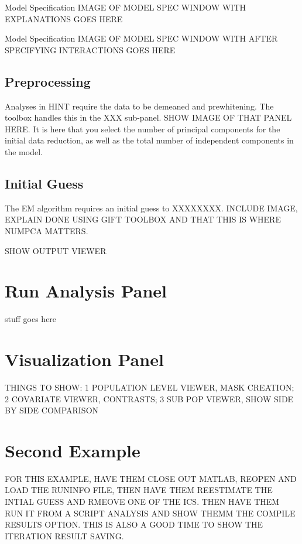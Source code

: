 \documentclass[11pt]{beamer}
\begin{document}
\begin{frame}{Model Specification}
IMAGE OF MODEL SPEC WINDOW WITH EXPLANATIONS GOES HERE
\end{frame}


\begin{frame}{Model Specification}
IMAGE OF MODEL SPEC WINDOW WITH AFTER SPECIFYING INTERACTIONS GOES HERE
\end{frame}

\subsection{Preprocessing}

\begin{frame}
Analyses in HINT require the data to be demeaned and prewhitening. The toolbox handles this in the XXX sub-panel. SHOW IMAGE OF THAT PANEL HERE. It is here that you select the number of principal components for the initial data reduction, as well as the total number of independent components in the model.
\end{frame}

\subsection{Initial Guess}

\begin{frame}
The EM algorithm requires an initial guess to XXXXXXXX. INCLUDE IMAGE, EXPLAIN DONE USING GIFT TOOLBOX AND THAT THIS IS WHERE NUMPCA MATTERS.
\end{frame}

\begin{frame}
SHOW OUTPUT VIEWER
\end{frame}

\section{Run Analysis Panel}

\begin{frame}
stuff goes here
\end{frame}

\section{Visualization Panel}

\begin{frame}
THINGS TO SHOW: 1 POPULATION LEVEL VIEWER, MASK CREATION; 2 COVARIATE VIEWER, CONTRASTS; 3 SUB POP VIEWER, SHOW SIDE BY SIDE COMPARISON
\end{frame}

\section{Second Example}

\begin{frame}
FOR THIS EXAMPLE, HAVE THEM CLOSE OUT MATLAB, REOPEN AND LOAD THE RUNINFO FILE, THEN HAVE THEM REESTIMATE THE INTIAL GUESS AND RMEOVE ONE OF THE ICS. THEN HAVE THEM RUN IT FROM A SCRIPT ANALYSIS AND SHOW THEMM THE COMPILE RESULTS OPTION. THIS IS ALSO A GOOD TIME TO SHOW THE ITERATION RESULT SAVING. 
\end{frame}
\end{document}
